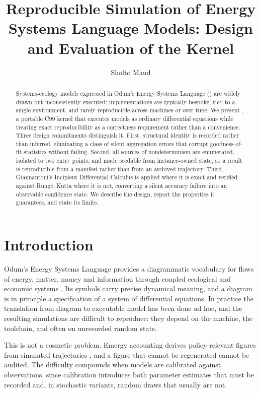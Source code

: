 \documentclass[11pt,a4paper]{article}
\title{Reproducible Simulation of Energy Systems Language Models: Design and Evaluation of the \gssk{} Kernel}
\author{Sholto Maud}
\date{}
\begin{document}
\maketitle

\begin{abstract}
Systems-ecology models expressed in Odum's Energy Systems Language (\esl) are widely drawn but inconsistently executed: implementations are typically bespoke, tied to a single environment, and rarely reproducible across machines or over time. We present \gssk, a portable C99 kernel that executes \esl{} models as ordinary differential equations while treating exact reproducibility as a correctness requirement rather than a convenience. Three design commitments distinguish it. First, structural identity is recorded rather than inferred, eliminating a class of silent aggregation errors that corrupt goodness-of-fit statistics without failing. Second, all sources of nondeterminism are enumerated, isolated to two entry points, and made seedable from instance-owned state, so a result is reproducible from a manifest rather than from an archived trajectory. Third, Giannantoni's Incipient Differential Calculus is applied where it is exact and verified against Runge--Kutta where it is not, converting a silent accuracy failure into an observable confidence state. We describe the design, report the properties it guarantees, and state its limits.
\end{abstract}

\section{Introduction}

Odum's Energy Systems Language provides a diagrammatic vocabulary for flows of energy, matter, money and information through coupled ecological and economic systems \citep{odum1994,odum2000}. Its symbols carry precise dynamical meaning, and a diagram is in principle a specification of a system of differential equations. In practice the translation from diagram to executable model has been done ad hoc, and the resulting simulations are difficult to reproduce: they depend on the machine, the toolchain, and often on unrecorded random state.

This is not a cosmetic problem. Emergy accounting derives policy-relevant figures from simulated trajectories \citep{odum1996,brown2025}, and a figure that cannot be regenerated cannot be audited. The difficulty compounds when models are calibrated against observations, since calibration introduces both parameter estimates that must be recorded and, in stochastic variants, random draws that usually are not.
\end{document}
